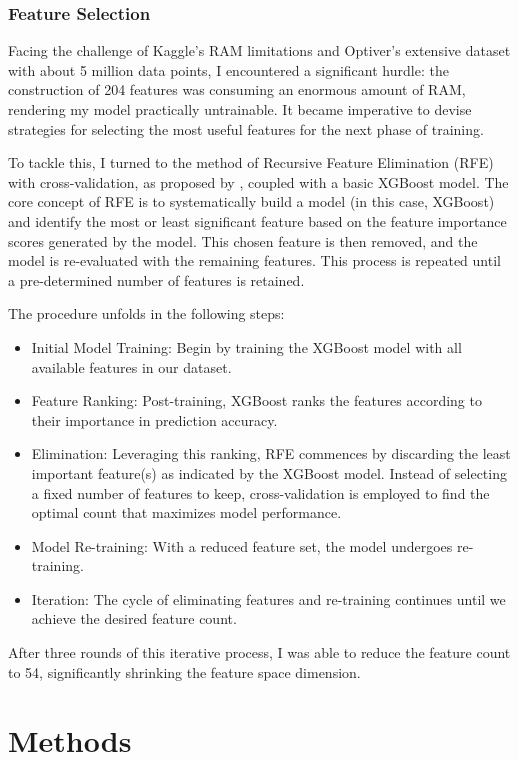 \documentclass[12pt]{article}
\newtheorem{Proof of Lemma}{Proof of Lemma}
\begin{document}
\subsubsection*{Feature Selection}

Facing the challenge of Kaggle's RAM limitations and Optiver's extensive dataset with about 5 million data points, I encountered a significant hurdle: the construction of 204 features was consuming an enormous amount of RAM, rendering my model practically untrainable. It became imperative to devise strategies for selecting the most useful features for the next phase of training.

To tackle this, I turned to the method of Recursive Feature Elimination (RFE) with cross-validation, as proposed by \citep{guyon2002gene}, coupled with a basic XGBoost model. The core concept of RFE is to systematically build a model (in this case, XGBoost) and identify the most or least significant feature based on the feature importance scores generated by the model. This chosen feature is then removed, and the model is re-evaluated with the remaining features. This process is repeated until a pre-determined number of features is retained.

The procedure unfolds in the following steps:
\begin{itemize}
  \item Initial Model Training: Begin by training the XGBoost model with all available features in our dataset.
  \item Feature Ranking: Post-training, XGBoost ranks the features according to their importance in prediction accuracy.
  \item Elimination: Leveraging this ranking, RFE commences by discarding the least important feature(s) as indicated by the XGBoost model. Instead of selecting a fixed number of features to keep, cross-validation is employed to find the optimal count that maximizes model performance.
  \item Model Re-training: With a reduced feature set, the model undergoes re-training.
  \item Iteration: The cycle of eliminating features and re-training continues until we achieve the desired feature count.
\end{itemize}

After three rounds of this iterative process, I was able to reduce the feature count to 54, significantly shrinking the feature space dimension.

\section{Methods}
\end{document}
